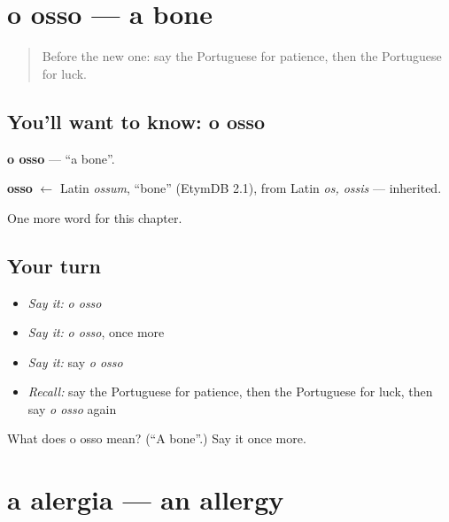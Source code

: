 \section[o osso]{o osso — a bone}

\label{lesson:PT-C211-osso}



\begin{quote}
Before the new one: say the Portuguese for patience, then the Portuguese for luck.
\end{quote}

\subsection*{You'll want to know: o osso}
\textbf{o osso} — \textquotedblleft{}a bone\textquotedblright{}.

\begin{cousinweb}
\textbf{osso} $\leftarrow$ Latin \emph{ossum}, \textquotedblleft{}bone\textquotedblright{} (EtymDB 2.1), from Latin \emph{os, ossis} — inherited.
\end{cousinweb}

\begin{grammarlens}[title={What you've built}]
One more word for this chapter.
\end{grammarlens}

\subsection*{Your turn}
\begin{itemize}
\raggedright
  \item \emph{Say it:} \emph{o osso}
  \item \emph{Say it:} \emph{o osso}, once more
  \item \emph{Say it:} say \emph{o osso}
  \item \emph{Recall:} say the Portuguese for patience, then the Portuguese for luck, then say \emph{o osso} again
\end{itemize}

\begin{tcolorbox}[breakable,colback=teal!4,colframe=teal!35!black,title={Before you move on}]
What does o osso mean? (\textquotedblleft{}A bone\textquotedblright{}.) Say it once more.
\end{tcolorbox}
\section[a alergia]{a alergia — an allergy}

